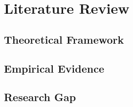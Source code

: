 \section{Literature Review}

\subsection{Theoretical Framework}

\subsection{Empirical Evidence}

\subsection{Research Gap}
